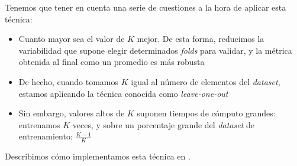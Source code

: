 Tenemos que tener en cuenta una serie de cuestiones a la hora de aplicar esta técnica:

\begin{itemize}
    \item Cuanto mayor sea el valor de $K$ mejor. De esta forma, reducimos la variabilidad que supone elegir determinados \textit{folds} para validar, y la métrica obtenida al final como un promedio es más robusta
    \item De hecho, cuando tomamos $K$ igual al número de elementos del \textit{dataset}, estamos aplicando la técnica conocida como \textit{leave-one-out} \cite{informatica:kfold_cross_val_paper}
    \item Sin embargo, valores altos de $K$ suponen tiempos de cómputo grandes: entrenamos $K$ veces, y sobre un porcentaje grande del \textit{dataset} de entrenamiento: $\frac{K - 1}{K}$
\end{itemize}

Describimos cómo implementamos esta técnica en .

